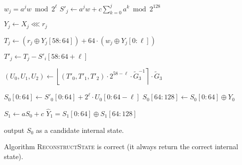 \documentclass[preprint,svgnames]{iacrtrans}
\begin{document}
  \begin{algorithmic}[1]
     
    \State $w_j = a^j w \bmod 2^{\ell}$ 
    \State $S'_j \gets a^j w + c \sum_{k = 0}^j a^k \bmod 2^{128}$    
    
     
    
    \State $Y_j \gets X_j \lll r_j$ 
    
    \State $ T_j \gets \left(r_j \oplus Y_j[58:64]\right) +  64 \cdot \left(w_j \oplus Y_j[0:\ell]\right)$  
    
    \State $ T'_j \gets    T_j -  S'_i[58:64+\ell]$  
    
    \State $(U_0, U_1, U_2) \gets \left\lfloor (T'_0, T'_1, T'_2) \cdot 2^{58-\ell} \cdot \widetilde G_3^{-1} \right\rceil \cdot \widetilde G_3$ 
    
    \State $ S_0[0:64] \gets  S'_0[0:64] + 2^{\ell} \cdot U_0[0:64-\ell]$ 
    \State $ S_0[64:128] \gets S_0[0:64] \oplus Y_0$ 
    
    \State $ S_1 \gets a  S_0 + c$ 
    \State $\widehat{Y}_1 =  S_1[0:64] \oplus  S_1[64:128]$
    
    \State output $ S_0$ as a candidate internal state.
    \EndIf
    \EndFor
    \EndFor
    \EndProcedure
  \end{algorithmic}
  
\begin{theorem}
  Algorithm \textsc{ReconstructState} is correct (it always return the correct internal state).
\end{theorem}
\end{document}
